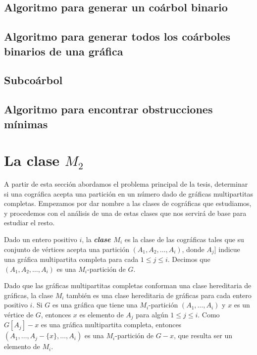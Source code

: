     \subsection{Algoritmo para generar un coárbol binario}
        
    \subsection{Algoritmo para generar todos los coárboles binarios de una gráfica}
        
    \subsection{Subcoárbol}
        
    \subsection{Algoritmo para encontrar obstrucciones mínimas} \label{sec_AlgoSub}
        


\section{La clase $M_2$}

A partir de esta sección abordamos el problema principal de la tesis,
determinar si una cográfica acepta una partición en un número dado de
gráficas multipartitas completas. Empezamos por dar nombre a las clases
de cográficas que estudiamos, y procedemos con el análisis de una de estas
clases que nos servirá de base para estudiar el resto.

Dado un entero positivo $i$, la \textbf{\emph{clase $M_i$}} es la clase de
las cogr\'aficas tales que su conjunto de v\'ertices acepta una partición
$(A_1, A_2, \dots, A_i)$, donde $A_j]$ indicue una gráfica multipartita
completa para cada $1 \le j \le i$.  Decimos que $(A_1, A_2, \dots, A_i)$
es una $M_i$-partición de $G$.

Dado que las gráficas multipartitas completas conforman una clase
hereditaria de gráficas, la clase $M_i$ tambi\'en es una clase hereditaria
de gráficas para cada entero positivo $i$.   Si $G$ es una gr\'afica que
tiene una $M_i$-partición $(A_1, \dots, A_i)$ y $x$ es un v\'ertice de $G$,
entonces $x$ es elemento de $A_j$ para alg\'un $1 \le j \le i$. Como
$G[A_j]-x$ es una gráfica multipartita completa, entonces $(A_1, \dots,
A_j - \{x\}, \dots, A_i)$ es una $M_i$-partici\'on de $G-x$, que resulta
ser un elemento de $M_i$.

